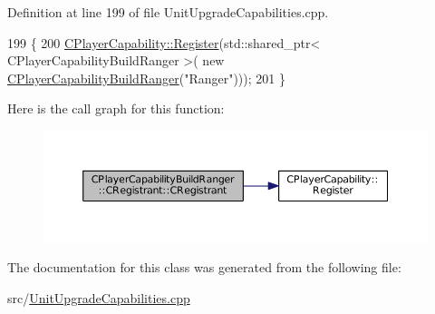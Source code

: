 Definition at line 199 of file Unit\+Upgrade\+Capabilities.\+cpp.


\begin{DoxyCode}
199                                                     \{
200     \hyperlink{classCPlayerCapability_a7e298018dcde2684451add3cfff065f7}{CPlayerCapability::Register}(std::shared\_ptr< CPlayerCapabilityBuildRanger >(\textcolor{keyword}{
      new} \hyperlink{classCPlayerCapabilityBuildRanger_adb3602c8f527157dcd0c9289272a9aa0}{CPlayerCapabilityBuildRanger}(\textcolor{stringliteral}{"Ranger"})));   
201 \}
\end{DoxyCode}
Here is the call graph for this function\+:\nopagebreak
\begin{figure}[H]
\begin{center}
\leavevmode
\includegraphics[width=350pt]{classCPlayerCapabilityBuildRanger_1_1CRegistrant_a8fb4327aa5143d6818e2451fc6ff2e9c_cgraph}
\end{center}
\end{figure}


The documentation for this class was generated from the following file\+:\begin{DoxyCompactItemize}
\item 
src/\hyperlink{UnitUpgradeCapabilities_8cpp}{Unit\+Upgrade\+Capabilities.\+cpp}\end{DoxyCompactItemize}
